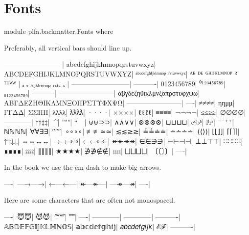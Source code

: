 \hypertarget{Fonts}{%
\chapter{Fonts}\label{Fonts}}

\begin{fence}
\begin{code}
module plfa.backmatter.Fonts where
\end{code}
\end{fence}

Preferably, all vertical bars should line up.

\begin{myDisplay}
--------------------------|
abcdefghijklmnopqrstuvwxyz|
ABCDEFGHIJKLMNOPQRSTUVWXYZ|
ᵃᵇᶜᵈᵉᶠᵍʰⁱʲᵏˡᵐⁿᵒᵖ ʳˢᵗᵘᵛʷˣʸᶻ|
ᴬᴮ ᴰᴱ ᴳᴴᴵᴶᴷᴸᴹᴺᴼᴾ ᴿ ᵀᵁⱽᵂ   |
ₐ   ₑ  ₕᵢⱼₖₗₘₙₒₚ ᵣₛₜᵤ  ₓ  |
--------------------------|
----------|
0123456789|
⁰¹²³⁴⁵⁶⁷⁸⁹|
₀₁₂₃₄₅₆₇₈₉|
----------|
------------------------|
αβγδεζηθικλμνξοπρστυφχψω|
ΑΒΓΔΕΖΗΘΙΚΛΜΝΞΟΠΡΣΤΥΦΧΨΩ|
------------------------|
----|
≠≠≠≠|
ηημμ|
ΓΓΔΔ|
ΣΣΠΠ|
λλλλ|
ƛƛƛƛ|
····|
××××|
ℓℓℓℓ|
≡≡≡≡|
¬¬¬¬|
≤≤≥≥|
∅∅∅∅|
————|
††‡‡|
^^^^|
''""|
``~~|
⊎⊎⊃⊃|
∧∧∨∨|
⊗⊗⊗⊗|
⊔⊔⊔⊔|
cᶜbᵇ|
lˡrʳ|
⁻⁻⁺⁺|
ℕℕℕℕ|
∀∀∃∃|
′′″″|
∘∘∘∘|
‌≢≢≃≃|
≲≲≳≳|
≟≟≐≐|
∸∸∸∸|
⟨⟨⟩⟩|
⌊⌊⌋⌋|
⌈⌈⌉⌉|
↑↑↓↓|
⇔⇔↔↔|
→→⇒⇒|
←←⇐⇐|
↞↞↠↠|
∈∈∋∋|
⊢⊢⊣⊣|
⊥⊥⊤⊤|
∷∷∷∷|
∎∎∎∎|
⦂⦂⦂⦂|
∥∥∥∥|
★★★★|
∌∌∉∉|
⨟⨟⨟⨟|
⨆⨆⨆⨆|
〔〔〕〕|
----|
\end{myDisplay}

In the book we use the em-dash to make big arrows.

\begin{myDisplay}
----|
—→—→|
←—←—|
↞—↞—|
—↠—↠|
----|
\end{myDisplay}

Here are some characters that are often not monospaced.

\begin{myDisplay}
----|
😇😇|
😈😈|
⁗⁗|
‴‴|
----|
------------|
------------|
----------|
𝔸𝔹𝔻𝔼𝔽𝔾𝕀𝕁𝕂𝕃𝕄ℕ𝕆𝕊|
𝕒𝕓𝕔𝕕𝕖𝕗𝕘𝕙𝕚𝕛|
𝑎𝑏𝑐𝑑𝑒𝑓𝑔𝑖𝑗𝑘|
ℰℱ|
----------|
\end{myDisplay}

